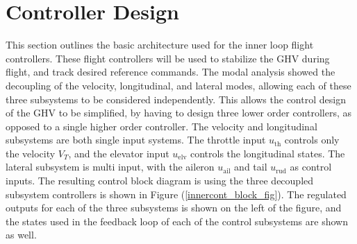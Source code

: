 \chapter{Controller Design}

This section outlines the basic architecture used for the inner loop flight controllers.
These flight controllers will be used to stabilize the GHV during flight, and track desired reference commands.
The modal analysis showed the decoupling of the velocity, longitudinal, and lateral modes, allowing each of these three subsystems to be considered independently.
This allows the control design of the GHV to be simplified, by having to design three lower order controllers, as opposed to a single higher order controller.
The velocity and longitudinal subsystems are both single input systems.
The throttle input $u_{\text{th}}$ controls only the velocity $V_{T}$, and the elevator input $u_{\text{elv}}$ controls the longitudinal states.
The lateral subsystem is multi input, with the aileron $u_{\text{ail}}$ and tail $u_{\text{rud}}$ as control inputs.
The resulting control block diagram is using the three decoupled subsystem controllers is shown in Figure (\ref{innercont_block_fig}).
The regulated outputs for each of the three subsystems is shown on the left of the figure, and the states used in the feedback loop of each of the control subsystems are shown as well.

